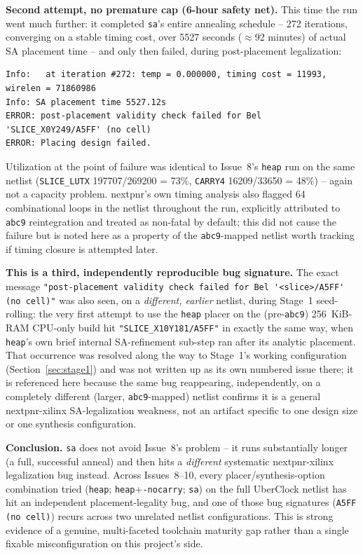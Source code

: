 \documentclass[11pt]{article}
\begin{document}
\textbf{Second attempt, no premature cap (6-hour safety net).} This time
the run went much further: it completed \lstinline{sa}'s entire
annealing schedule -- 272 iterations, converging on a stable timing cost,
over 5527 seconds ($\approx$92 minutes) of actual SA placement time --
and only then failed, during post-placement legalization:
\begin{lstlisting}[style=termout]
Info:   at iteration #272: temp = 0.000000, timing cost = 11993, wirelen = 71860986
Info: SA placement time 5527.12s
ERROR: post-placement validity check failed for Bel 'SLICE_X0Y249/A5FF' (no cell)
ERROR: Placing design failed.
\end{lstlisting}
Utilization at the point of failure was identical to Issue~8's
\lstinline{heap} run on the same netlist (\lstinline{SLICE_LUTX}
197707/269200 = 73\%, \lstinline{CARRY4} 16209/33650 = 48\%) -- again
not a capacity problem. nextpnr's own timing analysis also flagged 64
combinational loops in the netlist throughout the run, explicitly
attributed to \lstinline{abc9} reintegration and treated as non-fatal by
default; this did not cause the failure but is noted here as a property
of the \lstinline{abc9}-mapped netlist worth tracking if timing closure
is attempted later.

\textbf{This is a third, independently reproducible bug signature.} The
exact message \lstinline{"post-placement validity check failed for Bel '<slice>/A5FF' (no cell)"} was also seen, on a \emph{different, earlier}
netlist, during Stage~1 seed-rolling: the very first attempt to use the
\lstinline{heap} placer on the (pre-\lstinline{abc9}) 256~KiB-RAM
CPU-only build hit \lstinline{"SLICE_X10Y181/A5FF"} in exactly the same
way, when \lstinline{heap}'s own brief internal SA-refinement sub-step
ran after its analytic placement. That occurrence was resolved along the
way to Stage~1's working configuration (Section~\ref{sec:stage1}) and
was not written up as its own numbered issue there; it is referenced here
because the same bug reappearing, independently, on a completely
different (larger, \lstinline{abc9}-mapped) netlist confirms it is a
general nextpnr-xilinx SA-legalization weakness, not an artifact specific
to one design size or one synthesis configuration.

\textbf{Conclusion.} \lstinline{sa} does not avoid Issue~8's problem --
it runs substantially longer (a full, successful anneal) and then hits a
\emph{different} systematic nextpnr-xilinx legalization bug instead. Across
Issues~8--10, every placer/synthesis-option combination tried
(\lstinline{heap}; \lstinline{heap}+\lstinline{-nocarry}; \lstinline{sa})
on the full UberClock netlist has hit an independent placement-legality
bug, and one of those bug signatures (\lstinline{A5FF (no cell)}) recurs
across two unrelated netlist configurations. This is strong evidence of
a genuine, multi-faceted toolchain maturity gap rather than a single
fixable misconfiguration on this project's side.
\end{document}
